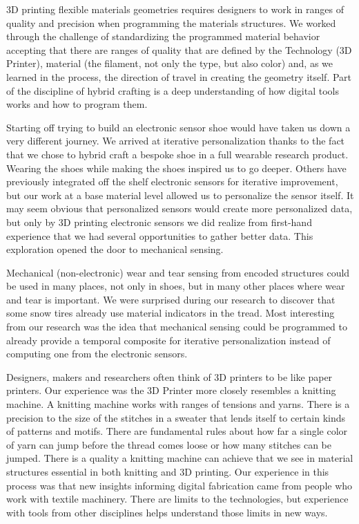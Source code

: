 3D printing flexible materials geometries requires designers to work in ranges of quality and precision when programming the materials structures. We worked through the challenge of standardizing the programmed material behavior accepting that there are ranges of quality that are defined by the Technology (3D Printer), material (the filament, not only the type, but also color) and, as we learned in the process, the direction of travel in creating the geometry itself. Part of the discipline of hybrid crafting is a deep understanding of how digital tools works and how to program them.

Starting off trying to build an electronic sensor shoe would have taken us down a very different journey. We arrived at iterative personalization thanks to the fact that we chose to hybrid craft a bespoke shoe in a full wearable research product. Wearing the shoes while making the shoes inspired us to go deeper. Others have previously integrated off the shelf electronic sensors for iterative improvement, but our work at a base material level allowed us to personalize the sensor itself. It may seem obvious that personalized sensors would create more personalized data, but only by 3D printing electronic sensors we did realize from first-hand experience that we had several opportunities to gather better data. This exploration opened the door to mechanical sensing. 

 Mechanical (non-electronic) wear and tear sensing from encoded structures could be used in many places, not only in shoes, but in many other places where wear and tear is important. We were surprised during our research to discover that some snow tires already use material indicators in the tread. Most interesting from our research was the idea that mechanical sensing could be programmed to already provide a temporal composite for iterative personalization instead of computing one from the electronic sensors. 
 
Designers, makers and researchers often think of 3D printers to be like paper printers. Our experience was the 3D Printer more closely resembles a knitting machine. A knitting machine works with ranges of tensions and yarns. There is a precision to the size of the stitches in a sweater that lends itself to certain kinds of patterns and motifs. There are fundamental rules about how far a single color of yarn can jump before the thread comes loose or how many stitches can be jumped. There is a quality a knitting machine can achieve that we see in material structures essential in both knitting and 3D printing. Our experience in this process was that new insights informing digital fabrication came from people who work with textile machinery. There are limits to the technologies, but experience with tools from other disciplines helps understand those limits in new ways.

